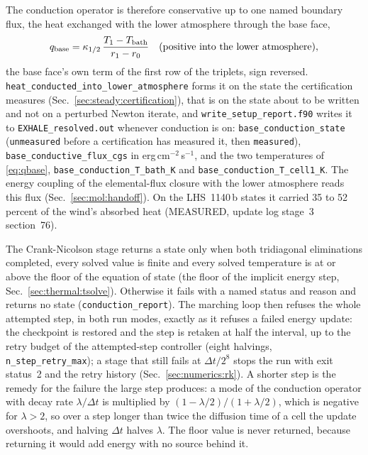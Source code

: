 The conduction operator is therefore conservative up to one named boundary
flux, the heat exchanged with the lower atmosphere through the base face,
\begin{equation}
  q_{\rm base} = \kappa_{1/2}\,\frac{T_1 - T_{\rm bath}}{r_1 - r_0}
  \quad\text{(positive into the lower atmosphere)},
  \label{eq:qbase}
\end{equation}
the base face's own term of the first row of the triplets, sign reversed.
\texttt{heat\_conducted\_into\_lower\_atmosphere} forms it on the state the
certification measures (Sec.~\ref{sec:steady:certification}), that is on the state
about to be written and not on a perturbed Newton iterate, and
\texttt{write\_setup\_report.f90} writes it to \texttt{EXHALE\_resolved.out}
whenever conduction is on: \texttt{base\_conduction\_state}
(\texttt{unmeasured} before a certification has measured it, then
\texttt{measured}), \texttt{base\_conductive\_flux\_cgs} in
erg\,cm$^{-2}$\,s$^{-1}$, and the two temperatures of
\eqref{eq:qbase}, \texttt{base\_conduction\_T\_bath\_K} and
\texttt{base\_conduction\_T\_cell1\_K}.  The energy coupling of the
elemental-flux closure with the lower atmosphere reads this flux
(Sec.~\ref{sec:mol:handoff}).  On the LHS~1140\,b states it carried 35 to 52
percent of the wind's absorbed heat (MEASURED, update log stage~3
section~76).

The Crank-Nicolson stage returns a state only when both tridiagonal
eliminations completed, every solved value is finite and every solved
temperature is at or above the floor of the equation of state (the floor of
the implicit energy step, Sec.~\ref{sec:thermal:tsolve}).  Otherwise it fails
with a named status and reason and returns no state
(\texttt{conduction\_report}).  The marching loop then refuses the whole
attempted step, in both run modes, exactly as it refuses a failed energy
update: the checkpoint is restored and the step is retaken at half the
interval, up to the retry budget of the attempted-step controller (eight
halvings, \texttt{n\_step\_retry\_max}); a stage that still fails at
$\Delta t/2^8$ stops the run with exit status~2 and the retry history
(Sec.~\ref{sec:numerics:rk}).  A shorter step is the remedy for the failure the
large step produces: a mode of the conduction operator with decay rate
$\lambda/\Delta t$ is multiplied by $(1-\lambda/2)/(1+\lambda/2)$, which is
negative for $\lambda>2$, so over a step longer than twice the diffusion time
of a cell the update overshoots, and halving $\Delta t$ halves $\lambda$.  The
floor value is never returned, because returning it would add energy with no
source behind it.


